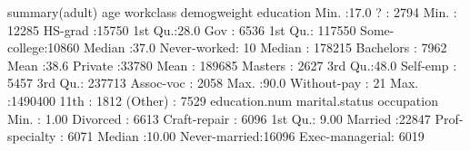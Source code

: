 \documentclass[
  11pt,
]{book}
\makeatletter
\newenvironment{Shaded}{}{}
\newcommand{\DecValTok}[1]{#1}
\newcommand{\FloatTok}[1]{#1}
\newcommand{\FunctionTok}[1]{#1}
\newcommand{\NormalTok}[1]{#1}
\newcommand{\SpecialCharTok}[1]{\textcolor[rgb]{0.39,0.39,0.39}{#1}}
\newenvironment{kframe}{%
\medskip{}
\setlength{\fboxsep}{.8em}
 \def\at@end@of@kframe{}%
 \ifinner\ifhmode%
  \def\at@end@of@kframe{\end{minipage}}%
  \begin{minipage}{\columnwidth}%
 \fi\fi%
 \def\FrameCommand##1{\hskip\@totalleftmargin \hskip-\fboxsep
 \colorbox{shadecolor}{##1}\hskip-\fboxsep
     \hskip-\linewidth \hskip-\@totalleftmargin \hskip\columnwidth}%
 \MakeFramed {\advance\hsize-\width
   \@totalleftmargin\z@ \linewidth\hsize
   \@setminipage}}%
 {\par\unskip\endMakeFramed%
 \at@end@of@kframe}
\renewenvironment{Shaded}{\begin{kframe}}{\end{kframe}}
\theoremstyle{definition}
\theoremstyle{definition}
\theoremstyle{definition}
\theoremstyle{definition}
\theoremstyle{remark}
\makeatother
\begin{document}
\begin{Shaded}
\begin{Highlighting}[]
\FunctionTok{summary}\NormalTok{(adult)}
\NormalTok{         age              workclass      demogweight             education    }
\NormalTok{    Min.   }\SpecialCharTok{:}\FloatTok{17.0}\NormalTok{   ?           }\SpecialCharTok{:} \DecValTok{2794}\NormalTok{   Min.   }\SpecialCharTok{:}  \DecValTok{12285}\NormalTok{   HS}\SpecialCharTok{{-}}\NormalTok{grad     }\SpecialCharTok{:}\DecValTok{15750}  
    \DecValTok{1}\NormalTok{st Qu.}\SpecialCharTok{:}\FloatTok{28.0}\NormalTok{   Gov         }\SpecialCharTok{:} \DecValTok{6536}   \DecValTok{1}\NormalTok{st Qu.}\SpecialCharTok{:} \DecValTok{117550}\NormalTok{   Some}\SpecialCharTok{{-}}\NormalTok{college}\SpecialCharTok{:}\DecValTok{10860}  
\NormalTok{    Median }\SpecialCharTok{:}\FloatTok{37.0}\NormalTok{   Never}\SpecialCharTok{{-}}\NormalTok{worked}\SpecialCharTok{:}   \DecValTok{10}\NormalTok{   Median }\SpecialCharTok{:} \DecValTok{178215}\NormalTok{   Bachelors   }\SpecialCharTok{:} \DecValTok{7962}  
\NormalTok{    Mean   }\SpecialCharTok{:}\FloatTok{38.6}\NormalTok{   Private     }\SpecialCharTok{:}\DecValTok{33780}\NormalTok{   Mean   }\SpecialCharTok{:} \DecValTok{189685}\NormalTok{   Masters     }\SpecialCharTok{:} \DecValTok{2627}  
    \DecValTok{3}\NormalTok{rd Qu.}\SpecialCharTok{:}\FloatTok{48.0}\NormalTok{   Self}\SpecialCharTok{{-}}\NormalTok{emp    }\SpecialCharTok{:} \DecValTok{5457}   \DecValTok{3}\NormalTok{rd Qu.}\SpecialCharTok{:} \DecValTok{237713}\NormalTok{   Assoc}\SpecialCharTok{{-}}\NormalTok{voc   }\SpecialCharTok{:} \DecValTok{2058}  
\NormalTok{    Max.   }\SpecialCharTok{:}\FloatTok{90.0}\NormalTok{   Without}\SpecialCharTok{{-}}\NormalTok{pay }\SpecialCharTok{:}   \DecValTok{21}\NormalTok{   Max.   }\SpecialCharTok{:}\DecValTok{1490400}   \DecValTok{11}\NormalTok{th        }\SpecialCharTok{:} \DecValTok{1812}  
\NormalTok{                                                          (Other)     }\SpecialCharTok{:} \DecValTok{7529}  
\NormalTok{    education.num         marital.status            occupation   }
\NormalTok{    Min.   }\SpecialCharTok{:} \FloatTok{1.00}\NormalTok{   Divorced     }\SpecialCharTok{:} \DecValTok{6613}\NormalTok{   Craft}\SpecialCharTok{{-}}\NormalTok{repair   }\SpecialCharTok{:} \DecValTok{6096}  
    \DecValTok{1}\NormalTok{st Qu.}\SpecialCharTok{:} \FloatTok{9.00}\NormalTok{   Married      }\SpecialCharTok{:}\DecValTok{22847}\NormalTok{   Prof}\SpecialCharTok{{-}}\NormalTok{specialty }\SpecialCharTok{:} \DecValTok{6071}  
\NormalTok{    Median }\SpecialCharTok{:}\FloatTok{10.00}\NormalTok{   Never}\SpecialCharTok{{-}}\NormalTok{married}\SpecialCharTok{:}\DecValTok{16096}\NormalTok{   Exec}\SpecialCharTok{{-}}\NormalTok{managerial}\SpecialCharTok{:} \DecValTok{6019}  

\end{Highlighting}
\end{Shaded}
\end{document}
